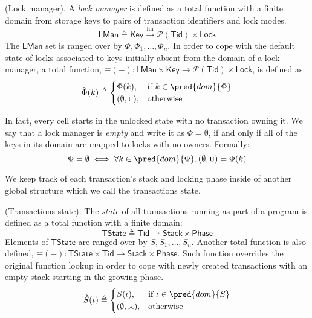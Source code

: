 \begin{defn}
	(Lock manager).
	A \emph{lock manager} is defined as a total function with a finite domain from storage keys to pairs of transaction identifiers and lock modes.
	\[
		\mathsf{LMan} \triangleq \mathsf{Key} \xrightarrow{\text{fin}} \mathcal{P}(\mathsf{Tid}) \times \mathsf{Lock}
	\]
	The $\mathsf{LMan}$ set is ranged over by $\Phi, \Phi_1, \ldots, \Phi_n$. In order to cope with the default state of locks associated to keys initially absent from the domain of a lock manager, a total function, $\hat{-}(-) : \mathsf{LMan} \times \mathsf{Key} \rightarrow \mathcal{P}(\mathsf{Tid}) \times \mathsf{Lock}$, is defined as:
	\[
		\hat{\Phi}(k)
			\triangleq
		\begin{cases}
			\Phi(k), & \text{if } k \in \pred{dom}{\Phi} \\
			(\emptyset, \textsc{u}), & \text{otherwise}
		\end{cases}
	\]	
\end{defn}
In fact, every cell starts in the unlocked state with no transaction owning it. We say that a lock manager is \textit{empty} and write it as $\Phi = \emptyset$, if and only if all of the keys in its domain are mapped to locks with no owners. Formally:
	\[
		\Phi = \emptyset \iff \forall k \in \pred{dom}{\Phi} \ldotp (\emptyset, \textsc{u}) = \Phi(k)
	\]

We keep track of each transaction's stack and locking phase inside of another global structure which we call the transactions state.
\begin{defn}
	(Transactions state).
	The \emph{state} of all transactions running as part of a program is defined as a total function with a finite domain:
	\[
		\mathsf{TState} \triangleq \mathsf{Tid} \rightharpoonup \mathsf{Stack} \times \mathsf{Phase}
	\]
	Elements of $\mathsf{TState}$ are ranged over by $S, S_1, \ldots, S_n$. Another total function is also defined, $\hat{-}(-) : \mathsf{TState} \times \mathsf{Tid} \rightarrow \mathsf{Stack} \times \mathsf{Phase}$. Such function overrides the original function lookup in order to cope with newly created transactions with an empty stack starting in the growing phase.
	\[
		\hat{S}(\iota)
			\triangleq
		\begin{cases}
			S(\iota), & \text{if } \iota \in \pred{dom}{S} \\
			(\emptyset, \curlywedge), & \text{otherwise}
		\end{cases}
	\]	
\end{defn}